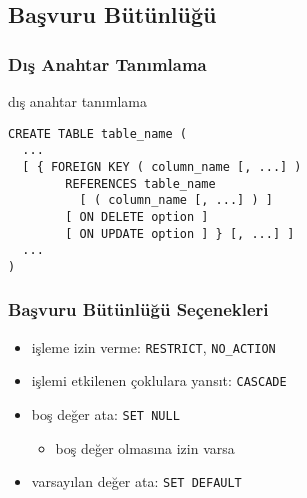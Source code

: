 \documentclass[dvipsnames]{beamer}
\theoremstyle{definition}
\theoremstyle{example}
\theoremstyle{plain}
\begin{document}
\subsection{Başvuru Bütünlüğü}

\begin{frame}[fragile]
  \frametitle{Dış Anahtar Tanımlama}

  \begin{block}{dış anahtar tanımlama}
    \begin{lstlisting}
CREATE TABLE table_name (
  ...
  [ { FOREIGN KEY ( column_name [, ...] )
        REFERENCES table_name
          [ ( column_name [, ...] ) ]
        [ ON DELETE option ]
        [ ON UPDATE option ] } [, ...] ]
  ...
)
    \end{lstlisting}
  \end{block}
\end{frame}

\begin{frame}
  \frametitle{Başvuru Bütünlüğü Seçenekleri}

  \begin{itemize}
    \item işleme izin verme: \texttt{RESTRICT}, \texttt{NO\_ACTION}

    \pause
    \item işlemi etkilenen çoklulara yansıt: \texttt{CASCADE}

    \pause
    \item boş değer ata: \texttt{SET NULL}
    \begin{itemize}
      \item boş değer olmasına izin varsa
    \end{itemize}

    \pause
    \item varsayılan değer ata: \texttt{SET DEFAULT}
  \end{itemize}
\end{frame}
\end{document}

